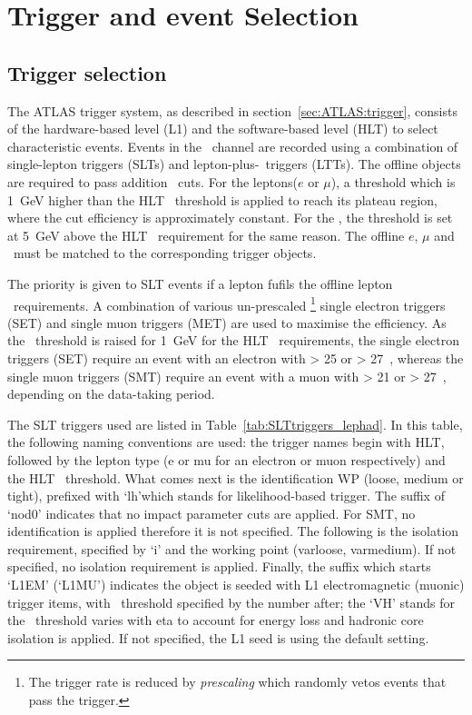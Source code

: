 \section{Trigger and event Selection}

\subsection{Trigger selection}
\label{sec:DiHiggs:trigger}

The ATLAS trigger system, as described in section~\ref{sec:ATLAS:trigger},
consists of the hardware-based level (L1) and the software-based level (HLT)
to select characteristic events. 
Events in the \lephad\ channel
are recorded using a combination of single-lepton triggers (SLTs) 
and lepton-plus-\tauhad\ triggers (LTTs). 
The offline objects are required to pass addition 
\pt\ cuts. For the leptons($e$ or $\mu$), a threshold which is
1~GeV higher than the HLT \pt\ threshold is applied to
reach its plateau region, where the cut efficiency is approximately constant. 
For the \tauhad, the threshold is set at 5~GeV above the
HLT \pt\ requirement for the same reason.
The offline $e$, $\mu$ and \tauhad\ must be matched to
the corresponding trigger objects. 

The priority is given to SLT events if a lepton fufils
the offline lepton \pt\ requirements. 
A combination of various un-prescaled 
\footnote{The trigger rate is reduced by \textit{prescaling} which randomly 
vetos events that pass the trigger.} 
single electron triggers (SET) 
and single muon triggers (MET) are used to 
maximise the efficiency.
As the \pt\ threshold is raised for 1~GeV for the 
HLT \pt\ requirements,
the single electron triggers (SET) 
require an event with an electron with \pT > 25 or > 27~\GeV,
whereas the single muon triggers (SMT) require an event with a 
muon with \pT > 21 or > 27~\GeV,  depending on the data-taking period.

The SLT triggers used are listed in Table~\ref{tab:SLTtriggers_lephad}. 
In this table, the following naming conventions are used:
the trigger names begin with HLT, followed by the 
lepton type (e or mu for an electron or muon respectively) and the 
HLT \pt\ threshold. 
What comes next is the identification WP (loose, medium or tight), 
prefixed with `lh'which stands for likelihood-based trigger. 
The suffix of `nod0' indicates that no impact parameter cuts are
applied. 
For SMT, no identification is applied 
therefore it is not specified. 
The following is the isolation requirement, 
specified by `i' and the working point (varloose, varmedium).
If not specified, no isolation requirement is applied.
Finally, the suffix which starts `L1EM' (`L1MU') indicates the 
object is seeded with L1 electromagnetic (muonic) trigger items, 
with \pt\ threshold specified by the number after; the `VH' stands for 
the \pt\ threshold varies with eta to account for energy loss
and hadronic core isolation is applied. If not specified,
the L1 seed is using the default setting. 


